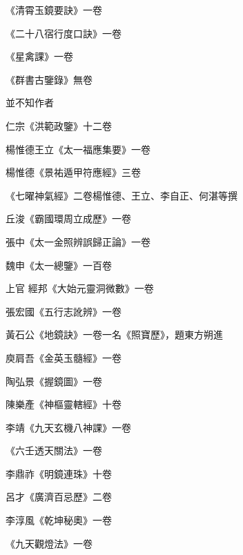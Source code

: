 \begin{pinyinscope}
 《清霄玉鏡要訣》一卷



 《二十八宿行度口訣》一卷



 《星禽課》一卷



 《群書古鑒錄》無卷



 並不知作者



 仁宗《洪範政鑒》十二卷



 楊惟德王立《太一福應集要》一卷



 楊惟德《景祐遁甲符應經》三卷



 《七曜神氣經》二卷楊惟德、王立、李自正、何湛等撰



 丘浚《霸國環周立成歷》一卷



 張中《太一金照辨誤歸正論》一卷



 魏申《太一總鑒》一百卷



 上官
 經邦《大始元靈洞微數》一卷



 張宏國《五行志訛辨》一卷



 黃石公《地鏡訣》一卷一名《照寶歷》，題東方朔進



 庾肩吾《金英玉髓經》一卷



 陶弘景《握鏡圖》一卷



 陳樂產《神樞靈轄經》十卷



 李靖《九天玄機八神課》一卷



 《六壬透天關法》一卷



 李鼎祚《明鏡連珠》十卷



 呂才《廣濟百忌歷》二卷



 李淳風《乾坤秘奧》一卷



 《九天觀燈法》一卷




\end{pinyinscope}
